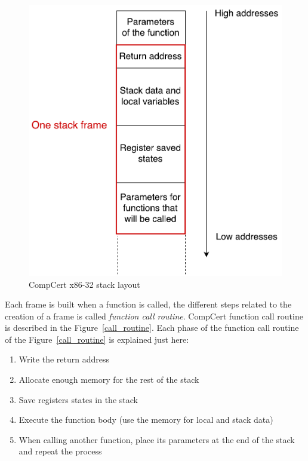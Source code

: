 \documentclass[11pt]{sdm}
\begin{document}
\begin{figure}[!ht]
\centering
\includegraphics[scale=0.55]{images/stack_layout.pdf}
\caption{CompCert x86-32 stack layout}
\label{stack_layout}
\end{figure}

Each frame is built when a function is called, the different steps related to the creation of a frame is called \textit{function call routine}.
CompCert function call routine is described in the Figure~\ref{call_routine}. Each phase of the function call routine of the Figure~\ref{call_routine} is explained just here:
\begin{enumerate}
	\item Write the return address
	\item Allocate enough memory for the rest of the stack
	\item Save registers states in the stack
	\item Execute the function body (use the memory for local and stack data)
	\item When calling another function, place its parameters at the end of the stack and repeat the process
\end{enumerate}
\end{document}

